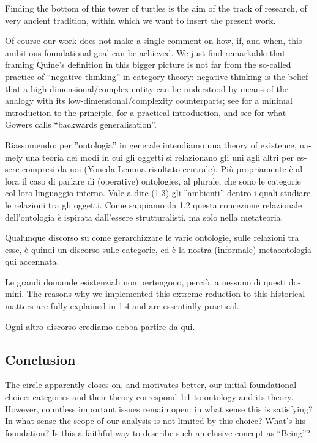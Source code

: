 Finding the bottom of this tower of turtles is the aim of the track of research, of very ancient tradition, within which we want to insert the present work.

Of course our work does not make a single comment on how, if, and when, this ambitious foundational goal can be achieved. We just find remarkable that framing Quine's definition in this bigger picture is not far from the so-called practice of ``negative thinking'' in category theory: negative thinking is the belief that a high-dimensional/complex entity can be understood by means of the analogy with its low-dimensional/complexity counterparts; see \cite{nlab:category-order,nlab:neg-think} for a minimal introduction to the principle, \cite{baez2010lectures} for a practical introduction, and see \cite{gowers2007} for what Gowers calls ``backwards generalisation''.


\begin{italian}
	Riassumendo: per ''ontologia'' in generale intendiamo una theory of existence, namely una teoria dei modi in cui gli oggetti si relazionano gli uni agli altri per essere compresi da noi (Yoneda Lemma risultato centrale). 
	Più propriamente è allora il caso di parlare di (operative) ontologies, al plurale, che sono le categorie col loro linguaggio interno. Vale a dire (1.3) gli ''ambienti'' dentro i quali studiare le relazioni tra gli oggetti. Come sappiamo da 1.2 questa concezione relazionale dell'ontologia è ispirata dall'essere strutturalisti, ma solo nella metateoria. %
	
	Qualunque discorso su come gerarchizzare le varie ontologie, sulle relazioni tra esse, è quindi un discorso sulle categorie, ed è la nostra (informale) metaontologia qui accennata. 
	
	Le grandi domande esistenziali non pertengono, perciò, a nessuno di questi domini. The reasons why we implemented this extreme reduction to this historical matters are fully explained in 1.4 and are essentially practical. 
	
	Ogni altro discorso crediamo debba partire da qui.   
\end{italian}
\subsection{Conclusion}
The circle apparently closes on, and motivates better, our initial foundational choice: categories and their theory correspond 1:1 to ontology and its theory. However, countless important issues remain open: in what sense this is satisfying? In what sense the scope of our analysis is not limited by this choice? What's his foundation? Is this a faithful way to describe such an elusive concept as ``Being''?

